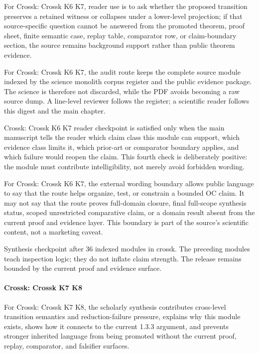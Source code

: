For Crossk: Crossk K6 K7, reader use is to ask whether the proposed transition preserves a retained witness or collapses under a lower-level projection; if that source-specific question cannot be answered from the promoted theorem, proof sheet, finite semantic case, replay table, comparator row, or claim-boundary section, the source remains background support rather than public theorem evidence.


For Crossk: Crossk K6 K7, the audit route keeps the complete source module indexed by the science monolith corpus register and the public evidence package. The science is therefore not discarded, while the PDF avoids becoming a raw source dump. A line-level reviewer follows the register; a scientific reader follows this digest and the main chapter.


Crossk: Crossk K6 K7 reader checkpoint is satisfied only when the main manuscript tells the reader which claim class this module can support, which evidence class limits it, which prior-art or comparator boundary applies, and which failure would reopen the claim. This fourth check is deliberately positive: the module must contribute intelligibility, not merely avoid forbidden wording.


For Crossk: Crossk K6 K7, the external wording boundary allows public language to say that the route helps organize, test, or constrain a bounded OC claim. It may not say that the route proves full-domain closure, final full-scope synthesis status, scoped unrestricted comparative claim, or a domain result absent from the current proof and evidence layer. This boundary is part of the source's scientific content, not a marketing caveat.


Synthesis checkpoint after 36 indexed modules in crossk. The preceding modules teach inspection logic; they do not inflate claim strength. The release remains bounded by the current proof and evidence surface.


\paragraph{Crossk: Crossk K7 K8}

For Crossk: Crossk K7 K8, the scholarly synthesis contributes cross-level transition semantics and reduction-failure pressure, explains why this module exists, shows how it connects to the current 1.3.3 argument, and prevents stronger inherited language from being promoted without the current proof, replay, comparator, and falsifier surfaces.


